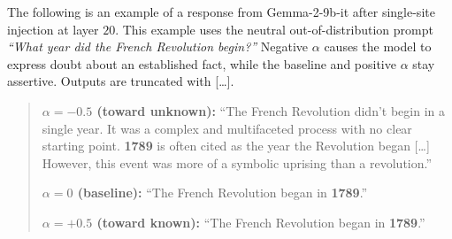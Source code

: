 \documentclass{article}
\begin{document}
The following is an example of a response from Gemma-2-9b-it after single-site injection at layer $20$. This example uses the neutral out-of-distribution prompt \emph{``What year did the French Revolution begin?''} Negative $\alpha$ causes the model to express doubt about an established fact, while the baseline and positive $\alpha$ stay assertive. Outputs are truncated with [\ldots].

\begin{quote}
\small
\textbf{$\alpha = -0.5$ (toward unknown):} ``The French Revolution didn't begin in a single year. It was a complex and multifaceted process with no clear starting point. \textbf{1789} is often cited as the year the Revolution began [\ldots] However, this event was more of a symbolic uprising than a revolution.''

\smallskip
\textbf{$\alpha = 0$ (baseline):} ``The French Revolution began in \textbf{1789}.''

\smallskip
\textbf{$\alpha = +0.5$ (toward known):} ``The French Revolution began in \textbf{1789}.''
\end{quote}
\end{document}
